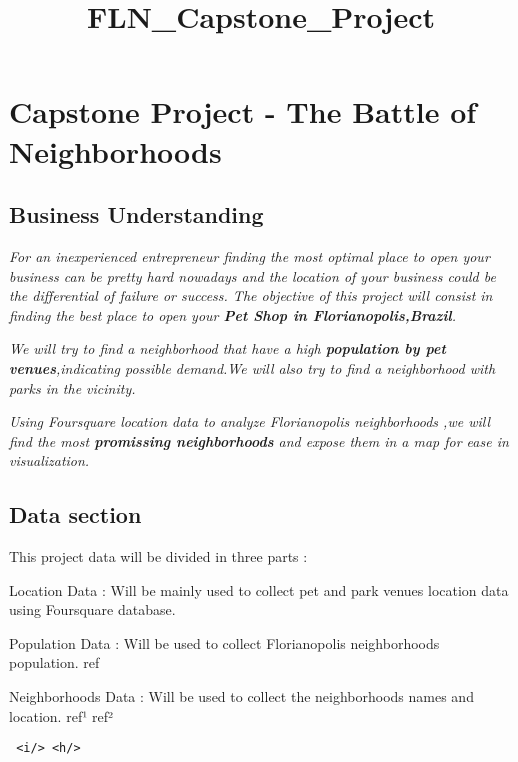 \documentclass[11pt]{article}
\title{FLN\_Capstone\_Project}
\begin{document}
    
    \maketitle
    
    

    
    \hypertarget{capstone-project---the-battle-of-neighborhoods}{%
\section{Capstone Project - The Battle of
Neighborhoods}\label{capstone-project---the-battle-of-neighborhoods}}

    \hypertarget{business-understanding}{%
\subsection{Business Understanding}\label{business-understanding}}

    \emph{For an inexperienced entrepreneur finding the most optimal place
to open your business can be pretty hard nowadays and the location of
your business could be the differential of failure or success. The
objective of this project will consist in finding the best place to open
your \textbf{Pet Shop in Florianopolis,Brazil}.}

\emph{We will try to find a neighborhood that have a high
\textbf{population by pet venues},indicating possible demand.We will
also try to find a neighborhood with parks in the vicinity.}

\emph{Using Foursquare location data to analyze Florianopolis
neighborhoods ,we will find the most \textbf{promissing neighborhoods}
and expose them in a map for ease in visualization.}

    \hypertarget{data-section}{%
\subsection{Data section}\label{data-section}}

     This project data will be divided in three parts :

Location Data : Will be mainly used to collect pet and park venues
location data using Foursquare database.

Population Data : Will be used to collect Florianopolis neighborhoods
population. ref

Neighborhoods Data : Will be used to collect the neighborhoods names and
location. ref¹ ref²

\begin{verbatim}
 <i/> <h/>
\end{verbatim}
\end{document}
